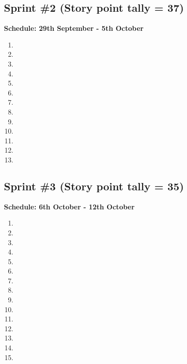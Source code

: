 \documentclass[12pt,titlepage]{article}
\begin{document}
\subsection{Sprint \#2 (Story point tally = 37)}
\textbf{Schedule: 29th September - 5th October}
\begin{enumerate}
   \item \storyFourPointThree{}
   \item \storyFourPointFour{}
   \item \storyFourPointFive{}
   \item \storyFivePointOne{}
   \item \storyFivePointTwo{}
   \item \storyThreePointFour{}
   \item \storySevenPointTwo{}
   \item \storySevenPointThree{}
   \item \storySevenPointFour{}
   \item \storySevenPointFive{}
   \item \storySevenPointSix{}
   \item \storyEightPointOne{}
   \item \storyEightPointTwo{}
\end{enumerate}

\subsection{Sprint \#3 (Story point tally = 35)}
\textbf{Schedule: 6th October - 12th October}
\begin{enumerate}
   \item \storyEightPointThree{}
   \item \storyEightPointFour{}
   \item \storyEightPointFive{}
   \item \storyEightPointSix{}
   \item \storyEightPointSeven{}
   \item \storyNinePointTwo{}
   \item \storyOnePointThree{}
   \item \storyTwoPointOne{}
   \item \storySevenPointOne{}
   \item \storyElevenPointOne{}
   \item \storyElevenPointTwo{}
   \item \storyElevenPointThree{}
   \item \storyElevenPointFour{}
   \item \storyElevenPointFive{}
   \item \storyFivePointThree{}
\end{enumerate}
\end{document}
